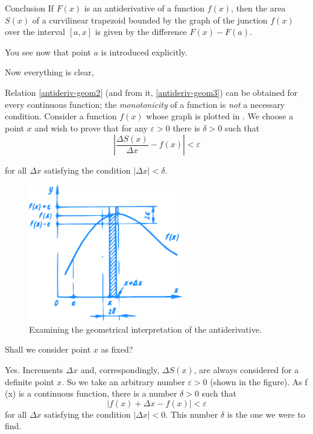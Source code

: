\begin{mytheo}{Conclusion}
If $F (x)$ is an antiderivative of a function $f (x)$, then the area $S (x)$ of a curvilinear trapezoid bounded by the graph of the junction $f (x)$ over the interval $[a, x]$ is given by the difference $F (x)- F (a)$.
\end{mytheo}
You see now that point $a$ is introduced explicitly. 

\rdr Now everything is clear, 

\athr Relation \eqref{antideriv-geom2} (and from it, \eqref{antideriv-geom3}) can be obtained for every continuous function; the \emph{monotonicity} of a function is \emph{not} a necessary condition. Consider a function $f (x)$ whose graph is plotted in . We choose a point $x$ and wish to prove that for any $\varepsilon > 0$ there is $\delta > 0 $ such that
\begin{equation}%
\left|  \dfrac{\Delta S (x)}{ \Delta x}   - f(x) \right| < \varepsilon
\label{antideriv-geom4}
\end{equation}

for all $\Delta x$ satisfying the condition $| \Delta x |<  \delta$. 

\begin{figure}[!ht]%
\centering
\includegraphics[width=0.6\textwidth]{figures/fig-47.pdf}
\caption{Examining the geometrical interpretation of the antiderivative.}
\label{fig-47}
\end{figure}

\rdr Shall we consider point $x$ as fixed? 

\athr Yes. Increments $\Delta x$ and, correspondingly,
$\Delta S (x)$, are always considered for a definite point $x$.
So we take an arbitrary number $\varepsilon > 0$ (shown in the figure).  As f (x) is a continuous function, there is a number $\delta > 0$ such that 
\begin{equation}%
|f(x) + \Delta x - f(x)| < \varepsilon
\label{antideriv-geom5}
\end{equation}
for all $\Delta x$ satisfying the condition $| \Delta x | < 0$. This number $\delta$ is the one we were to find.

